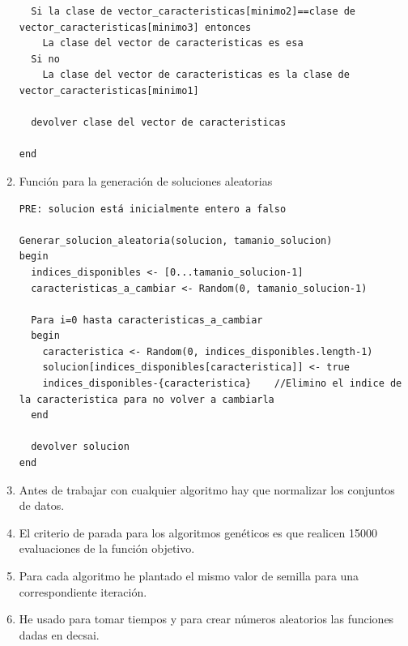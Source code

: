 \begin{enumerate}
\begin{lstlisting}
  Si la clase de vector_caracteristicas[minimo2]==clase de vector_caracteristicas[minimo3] entonces
    La clase del vector de caracteristicas es esa
  Si no
    La clase del vector de caracteristicas es la clase de vector_caracteristicas[minimo1]
    
  devolver clase del vector de caracteristicas
  
end
		\end{lstlisting}
		
		\item Función para la generación de soluciones aleatorias
\begin{lstlisting}
PRE: solucion está inicialmente entero a falso

Generar_solucion_aleatoria(solucion, tamanio_solucion)
begin
  indices_disponibles <- [0...tamanio_solucion-1]
  caracteristicas_a_cambiar <- Random(0, tamanio_solucion-1)
  
  Para i=0 hasta caracteristicas_a_cambiar
  begin
    caracteristica <- Random(0, indices_disponibles.length-1)
    solucion[indices_disponibles[caracteristica]] <- true
    indices_disponibles-{caracteristica}    //Elimino el indice de la caracteristica para no volver a cambiarla
  end
  
  devolver solucion
end

\end{lstlisting}
		
		\item Antes de trabajar con cualquier algoritmo hay que normalizar los conjuntos de datos.
		
		\item El criterio de parada para los algoritmos genéticos es que realicen 15000 evaluaciones de la función objetivo.
		
		\item Para cada algoritmo he plantado el mismo valor de semilla para una correspondiente iteración.
		
		\item He usado para tomar tiempos y para crear números aleatorios las funciones dadas en decsai.
	\end{enumerate}
	
